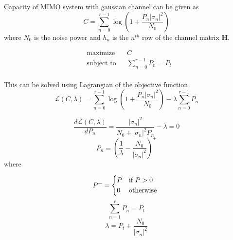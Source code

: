 \documentclass[conference]{IEEEtran}
\DeclareMathOperator{\subjectto}{subject\ to}
\def\bH{\mathbf{H}}
\begin{document}
Capacity of MIMO system with gaussian channel can be given as
\begin{equation*}
	C = \sum_{n=0}^{r-1} \log(1+\frac{P_n|\sigma_n|^2}{N_0})
\end{equation*}
where $N_0$ is the noise power and $h_n$ is the $n^{th}$ row of the channel matrix $\bH$.


\begin{equation*} \label{eq:3}
	\begin{aligned}
		& \text{maximize} && C\\
		& \subjectto && {\sum_{n=0}^{r-1}P_n = P_{t}}\\
	\end{aligned}
\end{equation*}

This can be solved using Lagrangian of the objective function
\begin{equation*}
	\mathcal{L}(C,\lambda) = \sum_{n=0}^{r-1} \log(1+\frac{P_n|\sigma_n|^2}{N_0}) - \lambda\sum_{n=0}^{r-1}P_n
\end{equation*}

\begin{equation*}
	\frac{d\mathcal{L}(C,\lambda)}{dP_n} = \frac{|\sigma_n|^2}{N_0+|\sigma_n|^2P_n}-\lambda = 0
\end{equation*}
\begin{equation*}
	P_n = \left(\frac{1}{\lambda}-\frac{N_0}{|\sigma_n|^2}\right)^+
\end{equation*}
where

  \begin{equation*} \label{eq:4}
    P^+ =
    \begin{cases*}
    	P & if $P > 0 $ \\
    	0        & otherwise
    \end{cases*}
  \end{equation*}
\begin{equation*}
	\sum_{n=1}^{r}P_n = P_t
\end{equation*}
\begin{equation*}
	\lambda = P_t+\frac{N_0}{|\sigma_n|^2}
\end{equation*}
\end{document}
